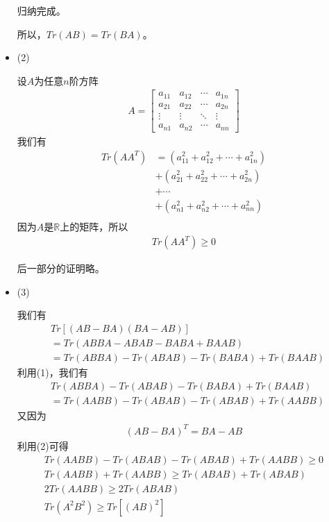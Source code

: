 \documentclass{article}
\begin{document}
\begin{itemize}
        归纳完成。

        所以，$Tr(AB) = Tr(BA)$。

  \item (2)

        设$A$为任意$n$阶方阵
        \begin{align*}
          A = \begin{bmatrix}
                a_{11} & a_{12} & \cdots & a_{1n} \\
                a_{21} & a_{22} & \cdots & a_{2n} \\
                \vdots & \vdots & \ddots & \vdots \\
                a_{n1} & a_{n2} & \cdots & a_{nn}
              \end{bmatrix}
        \end{align*}
        我们有
        \begin{align*}
          Tr(AA^T) & = (a_{11}^2 + a_{12}^2 + \cdots + a_{1n}^2) \\
                   & + (a_{21}^2 + a_{22}^2 + \cdots + a_{2n}^2) \\
                   & + \cdots                                    \\
                   & + (a_{n1}^2 + a_{n2}^2 + \cdots + a_{nn}^2) \\
        \end{align*}
        因为$A$是$\mathbb{R}$上的矩阵，所以
        \begin{align*}
          Tr(AA^T) \geq 0
        \end{align*}

        后一部分的证明略。

  \item (3)

        我们有
        \begin{align*}
           & Tr[(AB - BA)(BA - AB)]                      \\
           & = Tr(ABBA - ABAB - BABA + BAAB)             \\
           & = Tr(ABBA) - Tr(ABAB) - Tr(BABA) + Tr(BAAB)
        \end{align*}
        利用(1)，我们有
        \begin{align*}
           & Tr(ABBA) - Tr(ABAB) - Tr(BABA) + Tr(BAAB)   \\
           & = Tr(AABB) - Tr(ABAB) - Tr(ABAB) + Tr(AABB)
        \end{align*}
        又因为
        \begin{align*}
          (AB - BA)^T = BA - AB
        \end{align*}
        利用(2)可得
        \begin{align*}
          Tr(AABB) - Tr(ABAB) - Tr(ABAB) + Tr(AABB) \geq 0 \\
          Tr(AABB) + Tr(AABB) \geq Tr(ABAB) + Tr(ABAB)     \\
          2 Tr(AABB) \geq 2 Tr(ABAB)                       \\
          Tr(A^2B^2) \geq Tr[(AB)^2]
        \end{align*}
\end{itemize}
\end{document}
